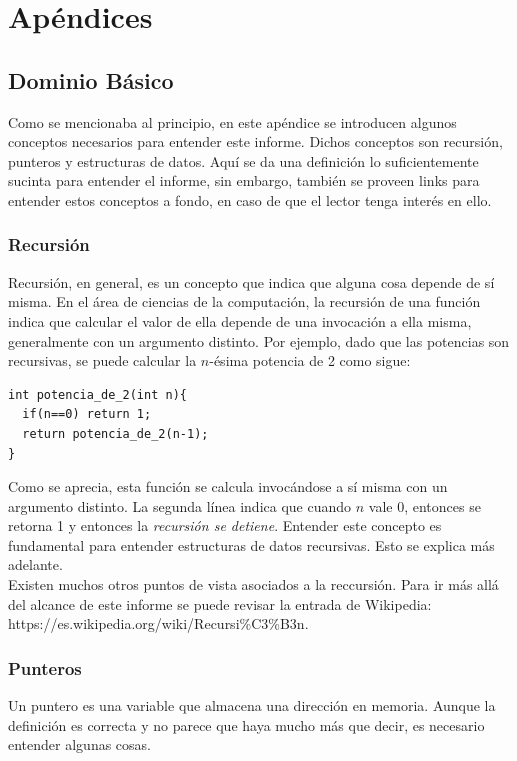 \documentclass[12pt,letterpaper]{report}
\begin{document}
\newpage
\section{Apéndices}
\subsection{Dominio Básico}
\label{subsec:apen_dombasico}
Como se mencionaba al principio, en este apéndice se introducen algunos conceptos necesarios para entender este informe. Dichos conceptos son recursión, punteros y estructuras de datos. Aquí se da una definición lo suficientemente sucinta para entender el informe, sin embargo, también se proveen links para entender estos conceptos a fondo, en caso de que el lector tenga interés en ello.

\subsubsection{Recursión}

Recursión, en general, es un concepto que indica que alguna cosa depende de sí misma. En el área de ciencias de la computación, la recursión de una función indica que calcular el valor de ella depende de una invocación a ella misma, generalmente con un argumento distinto. Por ejemplo, dado que las potencias son recursivas, se puede calcular la $n$-ésima potencia de 2 como sigue:

\begin{verbatim}
int potencia_de_2(int n){
  if(n==0) return 1;
  return potencia_de_2(n-1);
}
\end{verbatim}

Como se aprecia, esta función se calcula invocándose a sí misma con un argumento distinto. La segunda línea indica que cuando $n$ vale 0, entonces se retorna 1 y entonces la \emph{recursión se detiene}. Entender este concepto es fundamental para entender estructuras de datos recursivas. Esto se explica más adelante.\\

Existen muchos otros puntos de vista asociados a la reccursión. Para ir más allá del alcance de este informe se puede revisar la entrada de Wikipedia: https://es.wikipedia.org/wiki/Recursi\%C3\%B3n.

\subsubsection{Punteros}
Un puntero es una variable que almacena una dirección en memoria. Aunque la definición es correcta y no parece que haya mucho más que decir, es necesario entender algunas cosas.\\
\end{document}

